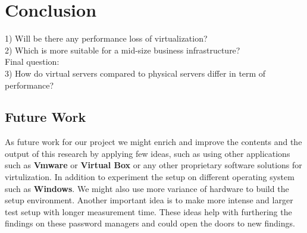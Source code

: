 \section{Conclusion}



        1) Will be there any performance loss of virtualization?\\

        2) Which is more suitable for a mid-size business infrastructure?\\

        Final question:\\
        3) How do virtual servers compared to physical servers differ in term of performance?\\


\subsection{Future Work}
As future work for our project we might enrich and improve the contents and the output of this research by applying few ideas, such as using other applications such as \textbf{Vmware} or \textbf{Virtual Box} or any other proprietary software solutions for virtulization.  In addition to experiment the setup on different operating system such as \textbf{Windows}. We might also use more variance of hardware to build the setup environment. Another important idea is to make more intense and larger test setup with longer measurement time. These ideas help with furthering the findings on these password managers and could open the doors to new findings.